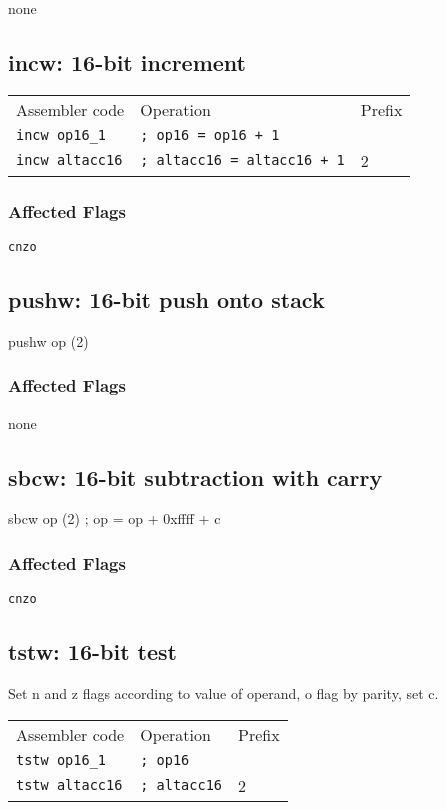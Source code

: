 \documentclass{book}
\begin{document}
none


\subsection{incw: 16-bit increment}

\begin{tabular}{l l l}
Assembler code         & Operation                          & Prefix \\
\texttt{incw op16\_1}  & \texttt{; op16 = op16 + 1}         & \\
\texttt{incw altacc16} & \texttt{; altacc16 = altacc16 + 1} & 2
\end{tabular}

\subsubsection*{Affected Flags}

\texttt{cnzo}


\subsection{pushw: 16-bit push onto stack}

pushw op (2)

\subsubsection*{Affected Flags}

none


\subsection{sbcw: 16-bit subtraction with carry}

sbcw op (2) ; op = op + 0xffff + c

\subsubsection*{Affected Flags}

\texttt{cnzo}


\subsection{tstw: 16-bit test}

Set n and z flags according to value of operand, o flag by parity, set c.

\begin{tabular}{l l l}
Assembler code         & Operation           & Prefix \\
\texttt{tstw op16\_1}  & \texttt{; op16}     & \\
\texttt{tstw altacc16} & \texttt{; altacc16} & 2
\end{tabular}
\end{document}

